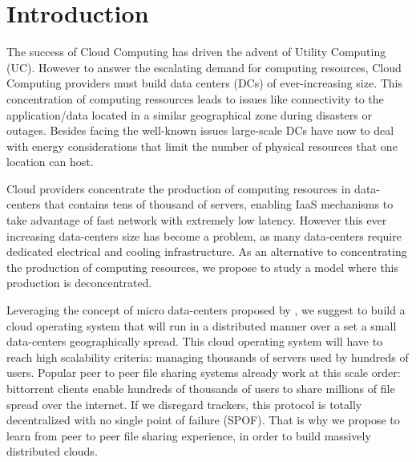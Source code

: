 \section{Introduction}
\label{sec:intro} 



The success of Cloud Computing has driven the advent of Utility Computing (UC). 
However to answer the escalating demand for computing resources, 
Cloud Computing providers must build data centers (DCs) of ever-increasing size.
This concentration of computing ressources leads to issues like connectivity to
the application/data located in a similar geographical zone during disasters or
outages. Besides facing the well-known issues large-scale DCs have now to deal 
with energy considerations that limit the number of physical resources that one 
location can host.

Cloud providers concentrate the production of computing resources in 
data-centers that contains tens of thousand of servers, enabling IaaS mechanisms
to take advantage of fast network with extremely low latency. However this ever 
increasing data-centers size has become a problem, as many data-centers require 
dedicated electrical and cooling infrastructure. As an alternative to 
concentrating the production of computing resources, we propose to study a model
where this production is deconcentrated.

Leveraging the concept of micro data-centers proposed by \cite{greenberg:2008},
we suggest to build a cloud operating system that will run in a distributed
manner over a set a small data-centers geographically spread. This cloud 
operating system will have to reach high scalability criteria: managing 
thousands of servers used by hundreds of users. Popular peer to peer file
sharing systems already work at this scale order: bittorrent clients enable 
hundreds of thousands of users to share millions of file spread over the 
internet. If we disregard trackers, this protocol is totally decentralized with 
no single point of failure (SPOF). That is why we propose to learn from peer to 
peer file sharing experience, in order to build massively distributed clouds.

